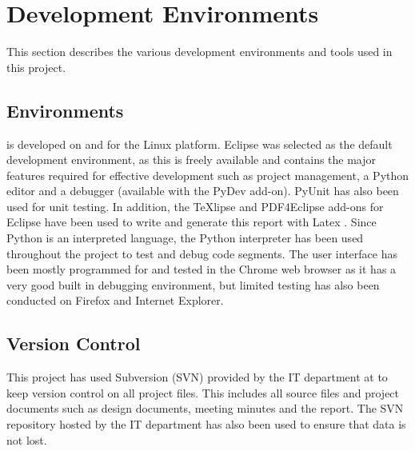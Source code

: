 \section{Development Environments}

This section describes the various development environments and tools used in
this project.

\subsection{Environments}

\snowman{} is developed on and for the Linux platform. Eclipse \cite{eclipse}
was selected as the default development environment, as this is freely available
and contains the major features required for effective development such as
project management, a Python editor and a debugger (available with the PyDev
add-on). PyUnit has also been used for unit testing. In addition, the TeXlipse
and PDF4Eclipse add-ons for Eclipse have been used to write and generate this
report with Latex \cite{latex}. Since Python is an interpreted language, the
Python interpreter has been used throughout the project to test and debug code
segments. The user interface has been mostly programmed for and tested in the
Chrome web browser as it has a very good built in debugging environment, but
limited testing has also been conducted on Firefox and Internet Explorer.

\subsection{Version Control}
This project has used Subversion (SVN) provided by the IT department at \GUC{}
to keep version control on all project files. This includes all source
files and project documents such as design documents, meeting minutes and
the report. The SVN repository hosted by the IT department has also been used to
ensure that data is not lost.